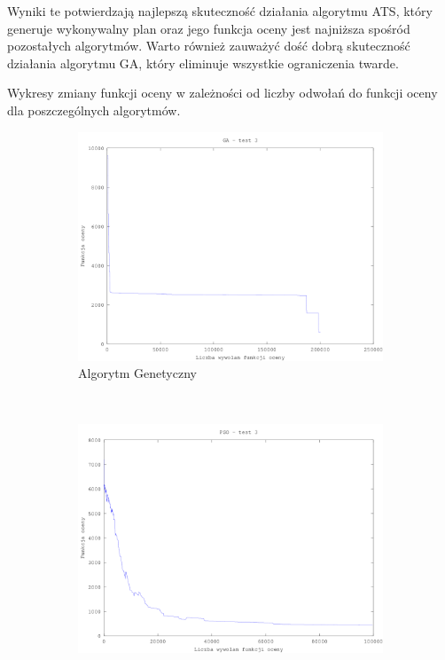 Wyniki te potwierdzają najlepszą skuteczność działania algorytmu ATS, który generuje wykonywalny plan oraz jego funkcja oceny jest najniższa spośród pozostałych algorytmów. Warto również zauważyć dość dobrą skuteczność działania algorytmu GA, który eliminuje wszystkie ograniczenia twarde.
\par  Wykresy zmiany funkcji oceny w zależności od liczby odwołań do funkcji oceny dla poszczególnych algorytmów.

\begin{figure}[H]
        \centering
\begin{subfigure}[b]{0.5\textwidth}
                \includegraphics[width=\textwidth]{ga_test_3.png}
                \caption{Algorytm Genetyczny}
        \end{subfigure}%
        ~ %
        \begin{subfigure}[b]{0.5\textwidth}
                \includegraphics[width=\textwidth]{pso_3.png}

\end{subfigure}
\end{figure}
